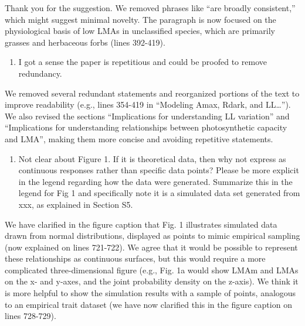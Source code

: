 \documentclass[
  12pt,
  letterpaper,
  DIV=11,
  numbers=noendperiod]{scrartcl}
\providecommand{\tightlist}{%
  \setlength{\itemsep}{0pt}\setlength{\parskip}{0pt}}\usepackage{longtable,booktabs,array}
\renewenvironment{quote}
  {\begin{customblockquote}\color{blockquote-text}\ignorespaces}
  {\end{customblockquote}}
\begin{document}
Thank you for the suggestion. We removed phrases like ``are broadly
consistent,'' which might suggest minimal novelty. The paragraph is now
focused on the physiological basis of low LMAs in unclassified species,
which are primarily grasses and herbaceous forbs (lines 392-419).

\begin{quote}
\begin{enumerate}
\def\labelenumi{\arabic{enumi})}
\setcounter{enumi}{4}
\tightlist
\item
  I got a sense the paper is repetitious and could be proofed to remove
  redundancy.
\end{enumerate}
\end{quote}

We removed several redundant statements and reorganized portions of the
text to improve readability (e.g., lines 354-419 in ``Modeling Amax,
Rdark, and LL\ldots{}''). We also revised the sections ``Implications
for understanding LL variation'' and ``Implications for understanding
relationships between photosynthetic capacity and LMA'', making them
more concise and avoiding repetitive statements.

\begin{quote}
\begin{enumerate}
\def\labelenumi{\arabic{enumi})}
\setcounter{enumi}{5}
\tightlist
\item
  Not clear about Figure 1. If it is theoretical data, then why not
  express as continuous responses rather than specific data points?
  Please be more explicit in the legend regarding how the data were
  generated. Summarize this in the legend for Fig 1 and specifically
  note it is a simulated data set generated from xxx, as explained in
  Section S5.
\end{enumerate}
\end{quote}

We have clarified in the figure caption that Fig. 1 illustrates
simulated data drawn from normal distributions, displayed as points to
mimic empirical sampling (now explained on lines 721-722). We agree that
it would be possible to represent these relationships as continuous
surfaces, but this would require a more complicated three-dimensional
figure (e.g., Fig. 1a would show LMAm and LMAs on the x- and y-axes, and
the joint probability density on the z-axis). We think it is more
helpful to show the simulation results with a sample of points,
analogous to an empirical trait dataset (we have now clarified this in
the figure caption on lines 728-729).
\end{document}
